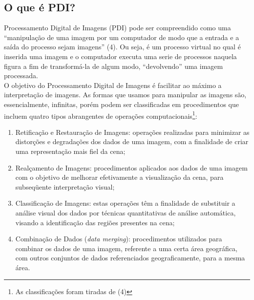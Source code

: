 \documentclass{article}
\begin{document}
        \subsection {O que é PDI?}
        Processamento Digital de Imagens (PDI) pode ser compreendido como uma ``manipulação de uma imagem por um computador de modo que a entrada e a saída do processo sejam imagens'' (4). Ou seja, é um processo virtual no qual é inserida uma imagem e o computador executa uma serie de processos naquela figura a fim de transformá-la de algum modo, ``devolvendo'' uma imagem processada.\\
        O objetivo do Processamento Digital de Imagens é facilitar ao máximo a interpretação de imagens. As formas que usamos para manipular as imagens são, essencialmente, infinitas, porém podem ser classificadas em procedimentos que incluem quatro tipos abrangentes de operações computacionais\footnote{As classificações foram tiradas de (4)}:
        
        \begin {enumerate}
            
            \item Retificação e Restauração de Imagens: operações realizadas para minimizar as distorções e degradações dos dados de uma imagem, com a finalidade de criar uma representação mais fiel da cena;
            
            \item Realçamento de Imagens: procedimentos aplicados aos dados de uma imagem com o objetivo de melhorar efetivamente a visualização da cena, para subseqüente interpretação visual;
            
            \item Classificação de Imagens: estas operações têm a finalidade de substituir a análise visual dos dados por técnicas quantitativas de análise automática, visando a identificação das regiões presentes na cena;
            
            \item Combinação de Dados ({\it data merging}): procedimentos utilizados para combinar os dados de uma imagem, referente a uma certa área geográfica, com outros conjuntos de dados referenciados geograficamente, para a mesma área.
       
        \end {enumerate}
        
        
\end{document}
